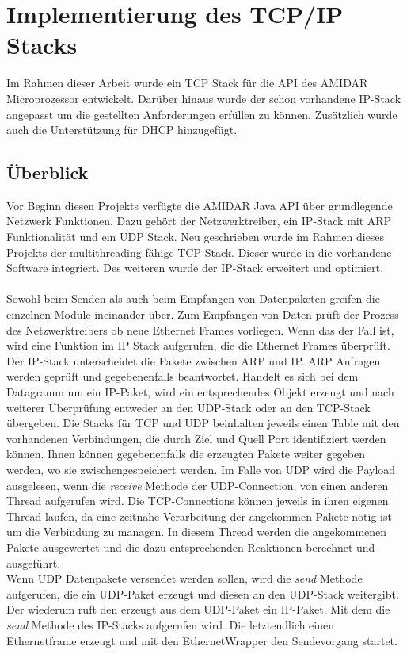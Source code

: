 \chapter{Implementierung des TCP/IP Stacks}
Im Rahmen dieser Arbeit wurde ein TCP Stack für die API des AMIDAR Microprozessor entwickelt. Darüber hinaus wurde der schon vorhandene IP-Stack angepasst um die gestellten Anforderungen erfüllen zu können. Zusätzlich wurde auch die Unterstützung für DHCP hinzugefügt.

\section{Überblick}
Vor Beginn diesen Projekts verfügte die AMIDAR Java API über grundlegende Netzwerk Funktionen. Dazu gehört der Netzwerktreiber, ein IP-Stack mit ARP Funktionalität und ein UDP Stack. Neu geschrieben wurde im Rahmen dieses Projekts der multithreading fähige TCP Stack. Dieser wurde in die vorhandene Software integriert. Des weiteren wurde der IP-Stack erweitert und optimiert.\\\\
Sowohl beim Senden als auch beim Empfangen von Datenpaketen greifen die einzelnen Module ineinander über. Zum Empfangen von Daten prüft der Prozess des Netzwerktreibers ob neue Ethernet Frames vorliegen. Wenn das der Fall ist, wird eine Funktion im IP Stack aufgerufen, die die Ethernet Frames überprüft. Der IP-Stack unterscheidet die Pakete zwischen ARP und IP. ARP Anfragen werden geprüft und gegebenenfalls beantwortet. Handelt es sich bei dem Datagramm um ein IP-Paket, wird ein entsprechendes Objekt erzeugt und nach weiterer Überprüfung entweder an den UDP-Stack oder an den TCP-Stack übergeben. Die Stacks für TCP und UDP beinhalten jeweils einen Table mit den vorhandenen Verbindungen, die durch Ziel und Quell Port identifiziert werden können. Ihnen können gegebenenfalls die erzeugten Pakete weiter gegeben werden, wo sie zwischengespeichert werden. Im Falle von UDP wird die Payload ausgelesen, wenn die \textit{receive} Methode der UDP-Connection, von einen anderen Thread aufgerufen wird. Die TCP-Connections können jeweils in ihren eigenen Thread laufen, da eine zeitnahe Verarbeitung der angekommen Pakete nötig ist um die Verbindung zu managen. In diesem Thread werden die angekommenen Pakete ausgewertet und die dazu entsprechenden Reaktionen berechnet und ausgeführt. \\
Wenn UDP Datenpakete versendet werden sollen, wird die \textit{send} Methode aufgerufen, die ein UDP-Paket erzeugt und diesen an den UDP-Stack weitergibt. Der wiederum ruft den erzeugt aus dem UDP-Paket ein IP-Paket. Mit dem die \textit{send} Methode des IP-Stacks aufgerufen wird. Die letztendlich einen Ethernetframe erzeugt und mit den EthernetWrapper den Sendevorgang startet.\\ \\
